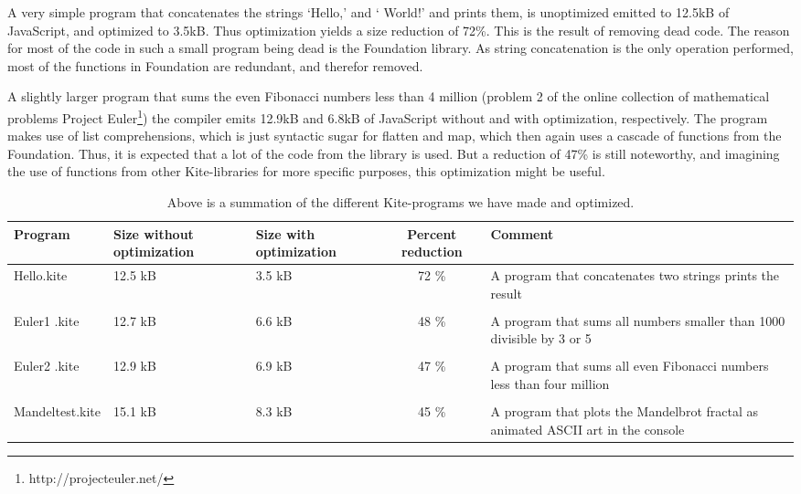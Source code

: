 A very simple program that concatenates the strings `Hello,' and ` World!' and prints them, is unoptimized emitted to 12.5kB of JavaScript, and optimized to 3.5kB. Thus optimization yields a size reduction of 72\%. This is the result of removing dead code. The reason for most of the code in such a small program being dead is the Foundation library. As string concatenation is the only operation performed, most of the functions in Foundation are redundant, and therefor removed.


A slightly larger program that sums the even Fibonacci numbers less than 4 million (problem 2 of the online collection of mathematical problems Project Euler\footnote{http://projecteuler.net/}) the compiler emits 12.9kB and 6.8kB of JavaScript without and with optimization, respectively. The program makes use of list comprehensions, which is just syntactic sugar for flatten and map, which then again uses a cascade of functions from the Foundation. Thus, it is expected that a lot of the code from the library is used. But a reduction of 47\% is still noteworthy, and imagining the use of functions from other Kite-libraries for more specific purposes, this optimization might be useful.


\begin{table}[H]
  \centering
  \begin{tabulary}{0.9\textwidth}{|L| L |L| C | L | }
    \hline
    Program & Size without optimization & Size with optimization & Percent reduction & Comment \\
    \hline
    Hello.kite       & 12.5 kB & 3.5 kB & 72 \% & A program that concatenates two strings prints the result \\
    & & & & \\
    Euler1 .kite       & 12.7 kB & 6.6 kB & 48 \% & A program that sums all numbers smaller than 1000 divisible by 3 or 5 \\
    & & & & \\
    Euler2 .kite       & 12.9 kB & 6.9 kB & 47 \% & A program that sums all even Fibonacci numbers less than four million \\
    & & & & \\
    Mandeltest.kite       & 15.1 kB & 8.3 kB & 45 \% & A program that plots the Mandelbrot fractal as animated ASCII art in the console\\
    \hline
  \end{tabulary}
  \caption{Above is a summation of the different Kite-programs we have made and optimized.}
\end{table}


